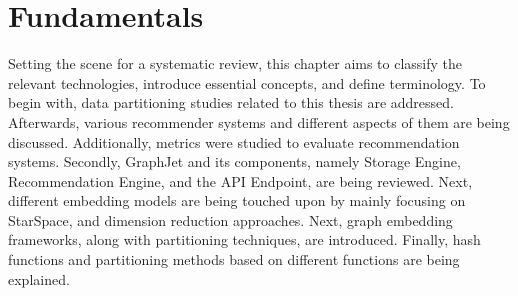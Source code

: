 \chapter{Fundamentals}
\label{chap:fundamentals}
Setting the scene for a systematic review, this chapter aims to classify the relevant technologies, introduce essential concepts, and define terminology. To begin with, data partitioning studies related to this thesis are addressed. Afterwards, various recommender systems and different aspects of them are being discussed. Additionally, metrics were studied to evaluate recommendation systems. Secondly, GraphJet and its components, namely Storage Engine, Recommendation Engine, and the API Endpoint, are being reviewed. Next, different embedding models are being touched upon by mainly focusing on StarSpace, and dimension reduction approaches. Next, graph embedding frameworks, along with partitioning techniques, are introduced. Finally, hash functions and partitioning methods based on different functions are being explained.
